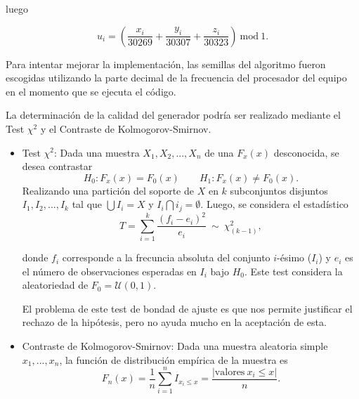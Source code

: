 \documentclass[12pt]{article}
\begin{document}
\begin{enumerate}
        luego 

        \begin{equation}
          u_i = \left(\frac{x_i}{30269} + \frac{y_i}{30307} + \frac{z_i}{30323}\right) ~ \textrm{mod} ~ 1.
        \end{equation}

        Para intentar mejorar la implementación, las semillas del algoritmo fueron escogidas utilizando
        la parte decimal de la frecuencia del procesador del equipo en el momento que se ejecuta el código. \medskip

        La determinación de la calidad del generador podría ser realizado mediante el Test $\chi^2$ y el 
        Contraste de Kolmogorov-Smirnov.

        \begin{itemize}
          \item Test $\chi^2$: Dada una muestra $X_1, X_2, ..., X_n$ de una $F_x(x)$ desconocida, se desea
            contrastar
            \begin{equation}
              H_0: F_x(x) = F_0(x) \qquad  H_1:F_x(x) \neq F_0(x).
            \end{equation}
            Realizando una partición del soporte de $X$ en $k$ subconjuntos disjuntos $I_1, I_2, ..., I_k$
            tal que $\bigcup I_i = X$ y $I_i \bigcap i_j = \emptyset$. Luego, se considera el estadístico
            \begin{equation}
              T = \sum_{i=1}^k \frac{(f_i - e_i)^2}{e_i} ~ \sim ~ \chi^2_{(k-1)},
            \end{equation}

            donde $f_i$ corresponde a la frecuncia absoluta del conjunto $i$-ésimo ($I_i$) y $e_i$ es el 
            número de observaciones esperadas en $I_i$ bajo $H_0$. Este test considera la aleatoriedad
            de $F_0 = \mathcal{U}(0,1)$. \medskip

            El problema de este test de bondad de ajuste es que nos permite justificar el rechazo de 
            la hipótesis, pero no ayuda mucho en la aceptación de esta.

          \item Contraste de Kolmogorov-Smirnov: Dada una muestra aleatoria simple $x_1, ..., x_n$, la 
            función de distribución empírica de la muestra es
            \begin{equation}
              F_n(x) = \frac1n \sum_{i=1}^n I_{x_i \leq x} = \frac{|\textrm{valores} ~ x_i \leq x|}{n}.
            \end{equation}


\end{itemize}
\end{enumerate}
\end{document}
